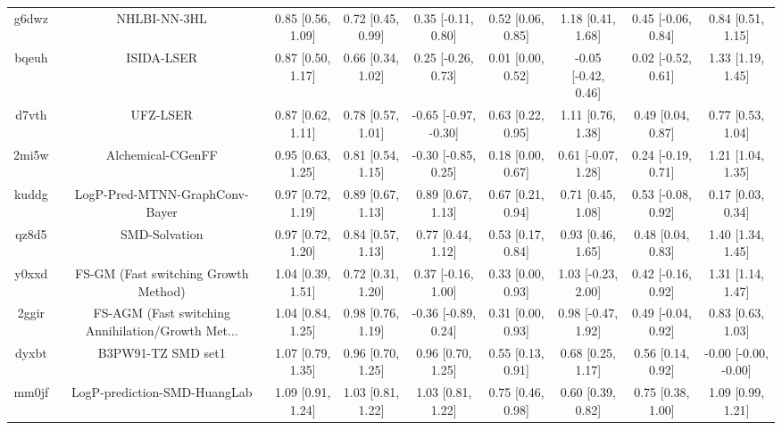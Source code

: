 \documentclass{article}
\begin{document}
\begin{center}
\begin{longtable}{|ccccccccc|}
 g6dwz &                                       NHLBI-NN-3HL &  0.85 [0.56, 1.09] &  0.72 [0.45, 0.99] &    0.35 [-0.11, 0.80] &  0.52 [0.06, 0.85] &    1.18 [0.41, 1.68] &   0.45 [-0.06, 0.84] &     0.84 [0.51, 1.15] \\
 bqeuh &                                         ISIDA-LSER &  0.87 [0.50, 1.17] &  0.66 [0.34, 1.02] &    0.25 [-0.26, 0.73] &  0.01 [0.00, 0.52] &  -0.05 [-0.42, 0.46] &   0.02 [-0.52, 0.61] &     1.33 [1.19, 1.45] \\
 d7vth &                                           UFZ-LSER &  0.87 [0.62, 1.11] &  0.78 [0.57, 1.01] &  -0.65 [-0.97, -0.30] &  0.63 [0.22, 0.95] &    1.11 [0.76, 1.38] &    0.49 [0.04, 0.87] &     0.77 [0.53, 1.04] \\
 2mi5w &                                  Alchemical-CGenFF &  0.95 [0.63, 1.25] &  0.81 [0.54, 1.15] &   -0.30 [-0.85, 0.25] &  0.18 [0.00, 0.67] &   0.61 [-0.07, 1.28] &   0.24 [-0.19, 0.71] &     1.21 [1.04, 1.35] \\
 kuddg &                     LogP-Pred-MTNN-GraphConv-Bayer &  0.97 [0.72, 1.19] &  0.89 [0.67, 1.13] &     0.89 [0.67, 1.13] &  0.67 [0.21, 0.94] &    0.71 [0.45, 1.08] &   0.53 [-0.08, 0.92] &     0.17 [0.03, 0.34] \\
 qz8d5 &                                      SMD-Solvation &  0.97 [0.72, 1.20] &  0.84 [0.57, 1.13] &     0.77 [0.44, 1.12] &  0.53 [0.17, 0.84] &    0.93 [0.46, 1.65] &    0.48 [0.04, 0.83] &     1.40 [1.34, 1.45] \\
 y0xxd &               FS-GM (Fast switching Growth Method) &  1.04 [0.39, 1.51] &  0.72 [0.31, 1.20] &    0.37 [-0.16, 1.00] &  0.33 [0.00, 0.93] &   1.03 [-0.23, 2.00] &   0.42 [-0.16, 0.92] &     1.31 [1.14, 1.47] \\
 2ggir &  FS-AGM (Fast switching Annihilation/Growth Met... &  1.04 [0.84, 1.25] &  0.98 [0.76, 1.19] &   -0.36 [-0.89, 0.24] &  0.31 [0.00, 0.93] &   0.98 [-0.47, 1.92] &   0.49 [-0.04, 0.92] &     0.83 [0.63, 1.03] \\
 dyxbt &                                 B3PW91-TZ SMD set1 &  1.07 [0.79, 1.35] &  0.96 [0.70, 1.25] &     0.96 [0.70, 1.25] &  0.55 [0.13, 0.91] &    0.68 [0.25, 1.17] &    0.56 [0.14, 0.92] &  -0.00 [-0.00, -0.00] \\
 mm0jf &                       LogP-prediction-SMD-HuangLab &  1.09 [0.91, 1.24] &  1.03 [0.81, 1.22] &     1.03 [0.81, 1.22] &  0.75 [0.46, 0.98] &    0.60 [0.39, 0.82] &    0.75 [0.38, 1.00] &     1.09 [0.99, 1.21] \\

\end{longtable}
\end{center}
\end{document}
